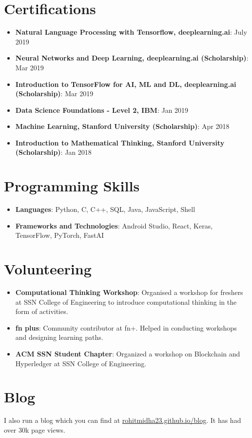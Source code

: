 \documentclass[letterpaper,11pt]{article}
\newcommand{\resumeItem}[2]{
  \item\small{
    \textbf{#1}{: #2 \vspace{-2pt}}
  }
}
\newcommand{\resumeSubItem}[2]{\resumeItem{#1}{#2}\vspace{-4pt}}
\newcommand{\resumeSubHeadingListStart}{\begin{itemize}[leftmargin=*]}
\newcommand{\resumeSubHeadingListEnd}{\end{itemize}}
\begin{document}
\section{Certifications}
  \resumeSubHeadingListStart
        \resumeSubItem
  {Natural Language Processing with Tensorflow, deeplearning.ai}{July 2019}
        \resumeSubItem
  {Neural Networks and Deep Learning, deeplearning.ai (Scholarship)}{Mar 2019}
      \resumeSubItem
  {Introduction to TensorFlow for AI, ML and DL, deeplearning.ai (Scholarship)}{Mar 2019}
    \resumeSubItem
      {Data Science Foundations - Level 2, IBM}{Jan 2019}
    \resumeSubItem
  {Machine Learning, Stanford University (Scholarship)}{Apr 2018}
    \resumeSubItem
  {Introduction to Mathematical Thinking, Stanford University (Scholarship)}{Jan 2018} 	
\resumeSubHeadingListEnd

\section{Programming Skills}
  \resumeSubHeadingListStart
   \item{
     \textbf{Languages}{: Python, C, C++, SQL, Java, JavaScript, Shell}
      }
      \item{
       \textbf{Frameworks and Technologies}{: Android Studio, React, Keras, TensorFlow, PyTorch, FastAI}
    }
  \resumeSubHeadingListEnd

\section{Volunteering}
\resumeSubHeadingListStart
\resumeItem{Computational Thinking Workshop}{Organised  a workshop for freshers at SSN College of Engineering to introduce computational thinking in the form of activities.}
\resumeItem{fn plus}{Community contributor at fn+. Helped in conducting workshops and designing learning paths.}
\resumeItem{ACM SSN Student Chapter}{Organized a workshop on Blockchain and Hyperledger at SSN College of Engineering.}
\resumeSubHeadingListEnd
\section{Blog}
I also run a blog which you can find at \href{https://rohitmidha23.github.io/blog}{rohitmidha23.github.io/blog}. It has had over 30k page views.
\end{document}
